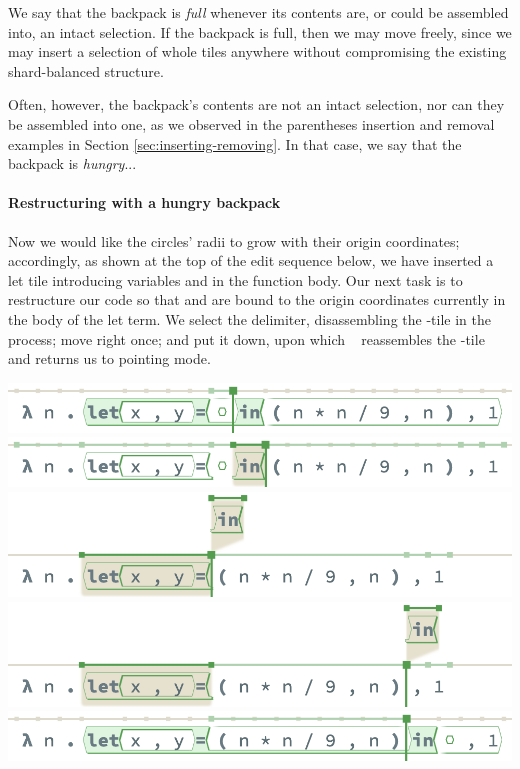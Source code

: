 We say that the backpack is \emph{full} whenever
its contents are, or could be assembled into, an intact selection.
If the backpack is full, then we may move freely,
since we may insert a selection of whole tiles anywhere
without compromising the existing shard-balanced structure.


Often, however, the backpack's contents are not an intact
selection, nor can they be assembled into one, as we observed
in the parentheses insertion and removal examples in Section \ref{sec:inserting-removing}.
In that case, we say that the backpack is \emph{hungry}...

\paragraph{Restructuring with a hungry backpack}

Now we would like the circles' radii to grow
with their origin coordinates; accordingly,
as shown at the top of the edit sequence below,
we have inserted
a let tile introducing variables  and 
in the function body.
Our next task is to restructure our code so that 
and  are bound to the origin coordinates
 currently in the body of the let term.
We select the  delimiter,
disassembling the -tile in the process;
move right once; and put it down,
upon which \tylr~ reassembles the -tile
and returns us to pointing mode.

\begin{center}
  \includegraphics[width=\columnwidth]{img/restructure-hungry-0.png}
  \includegraphics[width=\columnwidth]{img/restructure-hungry-1.png}
  \includegraphics[width=\columnwidth]{img/restructure-hungry-2.png}
  \includegraphics[width=\columnwidth]{img/restructure-hungry-3.png}
  \includegraphics[width=\columnwidth]{img/restructure-hungry-4.png}
\end{center}

